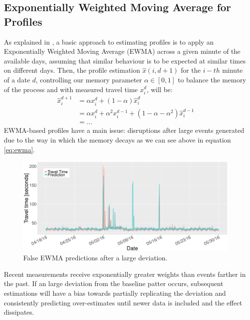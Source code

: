\documentclass[a4paper, 10pt, conference]{ieeeconf}      %
\begin{document}
\subsection{Exponentially Weighted Moving Average for Profiles} \label{ewma}
As explained in \cite{ttprofiles}, a basic approach to estimating profiles is to apply an Exponentially Weighted Moving Average (EWMA) across a given minute of the available days, assuming that similar behaviour is to be expected at similar times on different days. 
Then, the profile estimation $\hat{x}(i,d+1)$ for the $i-th$ minute of a date $d$, controlling our memory parameter $\alpha \in [0,1]$ to balance the memory of the process and with measured travel time $x_i^d$, will be:
\begin{equation}
\begin{aligned}
\hat{x}^{d+1}_i \!&= \alpha  x^{d}_{i} + (1-\alpha)\hat{x}^{d}_{i} \\ 
&= \alpha  x^{d}_{i} + \alpha^2  x^{d-1}_{i} + (1-\alpha - \alpha^2) \hat{x}^{d-1}_{i}\\ 
&= ...
\end{aligned}
\label{eq:ewma}
\end{equation}
EWMA-based profiles have a main issue: disruptions after large events generated due to the way in which the memory decays as we can see above in equation \ref{eq:ewma}.
\begin{figure}[htbp]
	\centerline{\includegraphics[width=\linewidth]{./images/EWMA.pdf}}
	\caption{False EWMA predictions after a large deviation.}
	\label{fig:EWMA}
\end{figure}
Recent measurements receive exponentially greater weights than events farther in the past. 
If an large deviation from the baseline patter occurs, subsequent estimations will have a bias towards partially replicating the deviation and consistently predicting over-estimates until newer data is included and the effect dissipates.
\end{document}
